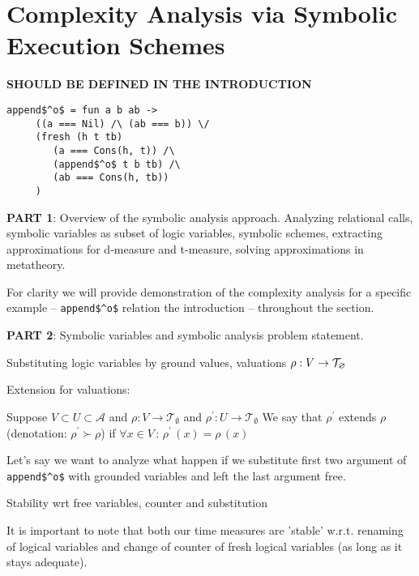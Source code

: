 \section{Complexity Analysis via Symbolic Execution Schemes}
\label{sec:symbolic}

\colorbox{red!20}{\textbf{SHOULD BE DEFINED IN THE INTRODUCTION}}
\begin{lstlisting}[basicstyle=\small]
   append$^o$ = fun a b ab ->
     ((a === Nil) /\ (ab === b)) \/
     (fresh (h t tb)
        (a === Cons(h, t)) /\
        (append$^o$ t b tb) /\
        (ab === Cons(h, tb)) 
     )
\end{lstlisting}

\colorbox{blue!20}{\parbox{\textwidth}{\textbf{PART 1}: Overview of the symbolic analysis approach.
Analyzing relational calls, symbolic variables as subset of logic variables, symbolic schemes, extracting approximations for d-measure and t-measure, solving approximations in metatheory.}}

For clarity we will provide demonstration of the complexity analysis for a specific example -- \lstinline|append$^o$| relation the introduction  -- throughout the section.

\colorbox{blue!20}{\parbox{\textwidth}{\textbf{PART 2}: Symbolic variables and symbolic analysis problem statement.}}

\colorbox{blue!20}{\parbox{\textwidth}{Substituting logic variables by ground values, valuations $\rho : V \to \mathcal{T}_{\varnothing}$}}

Extension for valuations:

\begin{definition}
  Suppose
  $ V \subset U \subset \mathcal{A} $
  and
  $ \rho \colon V \to \mathcal{T}_{\emptyset} $
  and
  $ \rho^\prime \colon U \to \mathcal{T}_{\emptyset} $
  We say that $\rho^\prime$ extends $\rho$ (denotation: $ \rho^\prime \succ \rho$) if
  $ \forall x \in V \,:\, \rho^\prime\,(x) = \rho\,(x) $
\end{definition}

Let's say we want to analyze what happen if we substitute first two argument of \lstinline|append$^o$| with grounded variables and left the last argument free.

\colorbox{blue!20}{\parbox{\textwidth}{Stability wrt free variables, counter and substitution}}

It is important to note that both our time measures are 'stable' w.r.t. renaming of logical variables and change of counter of fresh logical variables (as long as it stays adequate).

